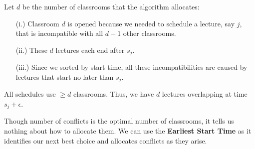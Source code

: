 \begin{Proof}
    Let $d$ be the number of classrooms that the algorithm allocates:

    \begin{enumerate}
        \item [(i.)] Classroom $d$ is opened because we needed to schedule a lecture, say $j$, that is incompatible with all $d - 1$ other classrooms.
        \item [(ii.)] These $d$ lectures each end after $s_j$.
        \item [(iii.)] Since we sorted by start time, all these incompatibilities are caused by lectures that start no later than $s_j$.
    \end{enumerate}
    \noindent
    All schedules use $\geq d$ classrooms. Thus, we have $d$ lectures overlapping at time $s_j + \epsilon$.

    \end{Proof}

    \begin{Tip}
        Though number of conflicts is the optimal number of classrooms, it tells us nothing about how to allocate them. We can use the \textbf{Earliest Start Time} as 
        it identifies our next best choice and allocates conflicts as they arise.
    \end{Tip}

